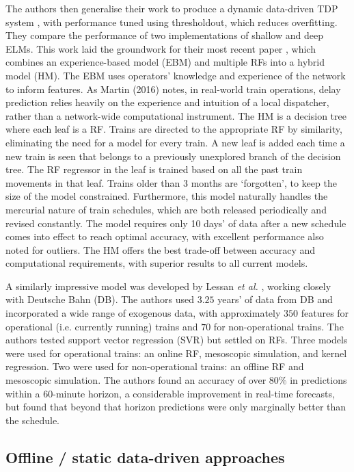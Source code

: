 \documentclass[12pt,a4paper]{article}
\begin{document}
The authors then generalise their work to produce a dynamic data-driven TDP system \cite{oneto_et_al_2017}, with performance tuned using thresholdout, which reduces overfitting. They compare the performance of two implementations of shallow and deep ELMs. 
This work laid the groundwork for their most recent paper \cite{oneto_et_al_2019}, which combines an experience-based model (EBM) and multiple RFs into a hybrid model (HM). The EBM uses operators’ knowledge and experience of the network to inform features. As Martin (2016) notes, in real-world train operations, delay prediction relies heavily on the experience and intuition of a local dispatcher, rather than a network-wide computational instrument. The HM is a decision tree where each leaf is a RF. Trains are directed to the appropriate RF by similarity, eliminating the need for a model for every train. A new leaf is added each time a new train is seen that belongs to a previously unexplored branch of the decision tree. The RF regressor in the leaf is trained based on all the past train movements in that leaf. Trains older than 3 months are ‘forgotten’, to keep the size of the model constrained. Furthermore, this model naturally handles the mercurial nature of train schedules, which are both released periodically and revised constantly. The model requires only 10 days’ of data after a new schedule comes into effect to reach optimal accuracy, with excellent performance also noted for outliers. The HM offers the best trade-off between accuracy and computational requirements, with superior results to all current models. 

A similarly impressive model was developed by Lessan \textit{et al.} \cite{lessan_fu_wen_2019}, working closely with Deutsche Bahn (DB). The authors used $3.25$ years’ of data from DB and incorporated a wide range of exogenous data, with approximately $350$ features for operational (i.e. currently running) trains and $70$ for non-operational trains. The authors tested support vector regression (SVR) but settled on RFs. Three models were used for operational trains: an online RF, mesoscopic simulation, and kernel regression. Two were used for non-operational trains: an offline RF and mesoscopic simulation. The authors found an accuracy of over $80\%$ in predictions within a $60$-minute horizon, a considerable improvement in real-time forecasts, but found that beyond that horizon predictions were only marginally better than the schedule.

\subsection{Offline / static data-driven approaches}
\end{document}
